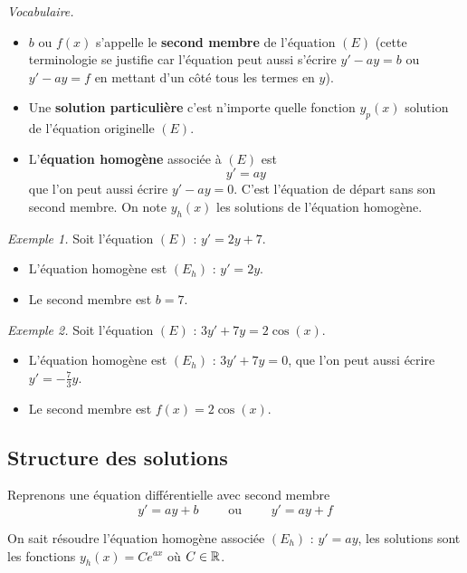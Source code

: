 \documentclass[11pt,class=report,crop=false]{standalone}
\begin{document}
\emph{Vocabulaire.}
\begin{itemize}
  \item $b$ ou $f(x)$ s'appelle le \textbf{second membre} de l'équation $(E)$ (cette terminologie se justifie car l'équation peut aussi s'écrire $y'-ay=b$ ou $y'-ay=f$ en mettant d'un côté tous les termes en $y$).

  \item Une \textbf{solution particulière} c'est n'importe quelle fonction $y_p(x)$ solution de l'équation originelle $(E)$.

  \item L'\textbf{équation homogène} associée à $(E)$ est 
\begin{equation}
y'=ay
\tag{$E_h$}
\end{equation}
que l'on peut aussi écrire $y'-ay=0$. C'est l'équation de départ sans son second membre. On note $y_h(x)$ les solutions de l'équation homogène.
\end{itemize}


\emph{Exemple 1.}
Soit l'équation $(E)$ : $y' = 2y + 7$.
\begin{itemize}
  \item L'équation homogène est $(E_h)$ : $y'=2y$.
  \item Le second membre est $b=7$.
\end{itemize}

\emph{Exemple 2.}
Soit l'équation $(E)$ : $3y' +7y = 2\cos(x)$.
\begin{itemize}
  \item L'équation homogène est $(E_h)$ : $3y'+7y=0$, que l'on peut aussi écrire $y' = -\frac73 y$.
  \item Le second membre est $f(x)=2\cos(x)$.
\end{itemize}



\subsection*{Structure des solutions}

Reprenons une équation différentielle avec second membre
\begin{equation}
y'=ay + b \qquad \text{ ou } \qquad y'=ay +f
\tag{$E$}
\end{equation}


On sait résoudre l'équation homogène associée $(E_h)$ : $y'=ay$, les solutions sont les fonctions $y_h(x) = Ce^{ax}$ où $C\in\mathbb{R}$.
\end{document}
